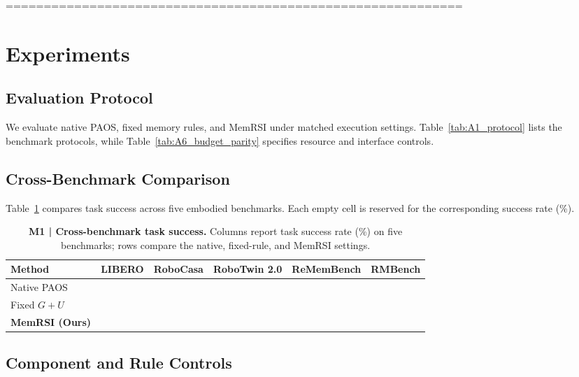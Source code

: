 ============================================================

\section{Experiments}
\label{sec:experiments}

\subsection{Evaluation Protocol}

We evaluate native PAOS, fixed memory rules, and MemRSI
under matched execution settings.
Table~\ref{tab:A1_protocol} lists the benchmark protocols,
while Table~\ref{tab:A6_budget_parity} specifies
resource and interface controls.

\subsection{Cross-Benchmark Comparison}

Table~\ref{tab:M1_main_results} compares task success
across five embodied benchmarks.
Each empty cell is reserved for the corresponding
success rate (\%).

\begin{table}[t]
\centering
\caption{\textbf{M1 | Cross-benchmark task success.}
Columns report task success rate (\%) on five benchmarks;
rows compare the native, fixed-rule, and MemRSI settings.}
\label{tab:M1_main_results}
\small
\setlength{\tabcolsep}{8pt}
\renewcommand{\arraystretch}{1.18}
\begin{tabular}{@{}lccccc@{}}
\toprule
\rowcolor{cvprblue!8}
\textbf{Method}
& \textbf{LIBERO}
& \textbf{RoboCasa}
& \textbf{RoboTwin 2.0}
& \textbf{ReMemBench}
& \textbf{RMBench} \\
\midrule
Native PAOS & & & & & \\
Fixed $G+U$ & & & & & \\
\midrule
\rowcolor{red!5}
\textbf{MemRSI (Ours)} & & & & & \\
\bottomrule
\end{tabular}
\end{table}

\subsection{Component and Rule Controls}

